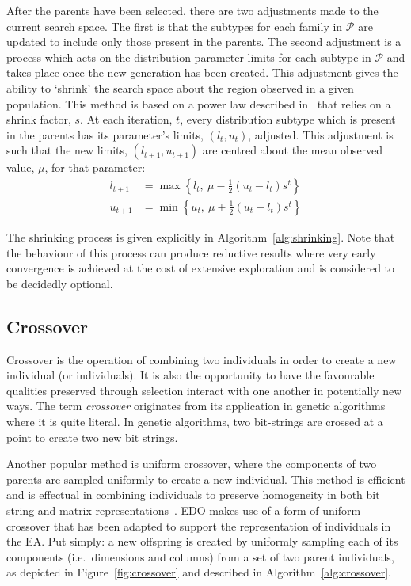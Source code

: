 After the parents have been selected, there are two adjustments made to the
current search space. The first is that the subtypes for each family in
\(\mathcal{P}\) are updated to include only those present in the parents. The
second adjustment is a process which acts on the distribution parameter limits
for each subtype in \(\mathcal{P}\) and takes place once the new generation has
been created. This adjustment gives the ability to `shrink' the search space
about the region observed in a given population. This method is based on a power
law described in~\cite{Amirjanov2016} that relies on a shrink factor, \(s\). At
each iteration, \(t\), every distribution subtype which is present in the
parents has its parameter's limits, \(\left(l_t, u_t\right)\), adjusted. This
adjustment is such that the new limits, \(\left(l_{t+1}, u_{t+1}\right)\) are
centred about the mean observed value, \(\mu\), for that parameter:
\begin{align}
    \label{eq:shrinking_lower}
    l_{t+1}&= \max \left\{l_t, \ \mu - \frac{1}{2} (u_t - l_t) s^t\right\}\\
    \label{eq:shrinking_upper}
    u_{t+1}&= \min \left\{u_t, \ \mu + \frac{1}{2} (u_t - l_t) s^t\right\}
\end{align}

The shrinking process is given explicitly in
Algorithm~\ref{alg:shrinking}. Note that the behaviour of this process can
produce reductive results where very early convergence is achieved at the cost
of extensive exploration and is considered to be decidedly optional.



\subsection{Crossover}

Crossover is the operation of combining two individuals in order to create a new
individual (or individuals). It is also the opportunity to have the favourable
qualities preserved through selection interact with one another in potentially
new ways. The term \emph{crossover} originates from its application in genetic
algorithms where it is quite literal. In genetic algorithms, two bit-strings are
crossed at a point to create two new bit strings.

Another popular method is uniform crossover, where the components of two parents
are sampled uniformly to create a new individual. This method is efficient and
is effectual in combining individuals to preserve homogeneity in both bit string
and matrix representations~\cite{Chen2018synthetic,Semenkin2012}. EDO makes use
of a form of uniform crossover that has been adapted to support the
representation of individuals in the EA. Put simply: a new offspring is created
by uniformly sampling each of its components (i.e.\ dimensions and columns) from
a set of two parent individuals, as depicted in Figure~\ref{fig:crossover} and
described in Algorithm~\ref{alg:crossover}.

